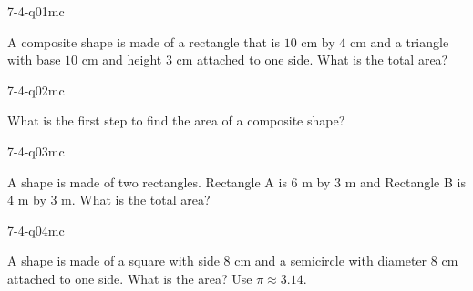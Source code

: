 

\begin{practiceQuestion}{7-4-q01}{mc}
\begin{questionText}
A composite shape is made of a rectangle that is $10$ cm by $4$ cm and a triangle with base $10$ cm and height $3$ cm attached to one side. What is the total area?
\end{questionText}
\end{practiceQuestion}

\begin{practiceQuestion}{7-4-q02}{mc}
\begin{questionText}
What is the first step to find the area of a composite shape?
\end{questionText}
\end{practiceQuestion}

\begin{practiceQuestion}{7-4-q03}{mc}
\begin{questionText}
A shape is made of two rectangles. Rectangle A is $6$ m by $3$ m and Rectangle B is $4$ m by $3$ m. What is the total area?
\end{questionText}
\end{practiceQuestion}

\begin{practiceQuestion}{7-4-q04}{mc}
\begin{questionText}
A shape is made of a square with side $8$ cm and a semicircle with diameter $8$ cm attached to one side. What is the area? Use $\pi \approx 3.14$.
\end{questionText}
\end{practiceQuestion}

